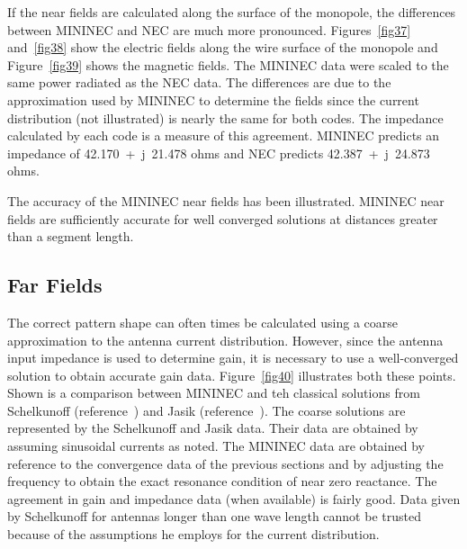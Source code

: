 \documentclass[12pt]{article}
\begin{document}
If the near fields are calculated along the surface of the monopole, the
differences between MININEC and NEC are much more pronounced.
Figures~\ref{fig37} and~\ref{fig38} show the electric fields along the
wire surface of the monopole and Figure~\ref{fig39} shows the magnetic
fields. The MININEC data were scaled to the same power radiated as the
NEC data. The differences are due to the approximation used by MININEC
to determine the fields since the current distribution (not illustrated)
is nearly the same for both codes. The impedance calculated by each code
is a measure of this agreement. MININEC predicts an impedance of
42.170~+~j~21.478 ohms and NEC predicts 42.387~+~j~24.873 ohms.

The accuracy of the MININEC near fields has been illustrated. MININEC
near fields are sufficiently accurate for well converged solutions at
distances greater than a segment length.

\subsection{Far Fields}
The correct pattern shape can often times be calculated using a coarse
approximation to the antenna current distribution. However, since the
antenna input impedance is used to determine gain, it is necessary to
use a well-converged solution to obtain accurate gain data.
Figure~\ref{fig40} illustrates both these points. Shown is a comparison
between MININEC and teh classical solutions from Schelkunoff
(reference~\cite{r22}) and Jasik (reference~\cite{r23}). The coarse
solutions are represented by the Schelkunoff and Jasik data. Their data
are obtained by assuming sinusoidal currents as noted. The MININEC data
are obtained by reference to the convergence data of the previous
sections and by adjusting the frequency to obtain the exact resonance
condition of near zero reactance. The agreement in gain and impedance
data (when available) is fairly good. Data given by Schelkunoff for
antennas longer than one wave length cannot be trusted because of the
assumptions he employs for the current distribution.
\end{document}
